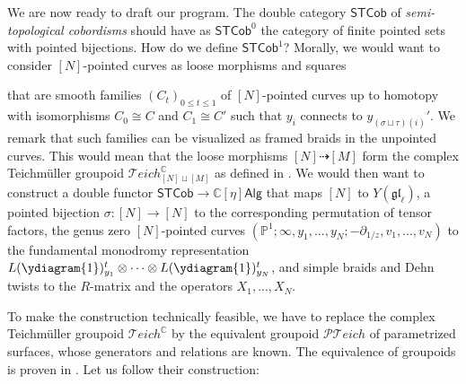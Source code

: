 \documentclass[11pt]{report}
\theoremstyle{definition}
\theoremstyle{remark}
\theoremstyle{remark}
\newcommand{\C}{\mathbb{C}}
\renewcommand{\P}{\mathbb{P}}
\begin{document}
We are now ready to draft our program. The double category $\mathsf{STCob}$ of \emph{semi-topological cobordisms} should have as $\mathsf{STCob}^0$ the category of finite pointed sets with pointed bijections. How do we define $\mathsf{STCob}^1$? Morally, we would want to consider $[N]$-pointed curves as loose morphisms and squares
\begin{center}
\end{center}
that are smooth families $(C_t)_{0 \leq t \leq 1}$ of $[N]$-pointed curves up to homotopy with isomorphisms $C_0 \cong C$ and $C_1 \cong C'$ such that $y_i$ connects to $y_{(\sigma \sqcup \tau)(i)}'$. We remark that such families can be visualized as framed braids in the unpointed curves. This would mean that the loose morphisms $[N] \dashrightarrow [M]$ form the complex Teichmüller groupoid $\mathcal{T}eich_{[N] \sqcup [M]}^\C$ as defined in \cite{book:bakalov}. We would then want to construct a double functor $\mathsf{STCob} \to \C[\eta]\mathsf{Alg}$ that maps $[N]$ to $Y(\mathfrak{gl}_\ell)$, a pointed bijection $\sigma: [N] \to [N]$ to the corresponding permutation of tensor factors, the genus zero $[N]$-pointed curves $(\P^1;\infty,y_1,...,y_N;-\partial_{1/z},v_1,...,v_N)$ to the fundamental monodromy representation $L(\ydiagram{1})_{y_1}^t \otimes \cdots \otimes L(\ydiagram{1})_{y_N}^t$, and simple braids and Dehn twists to the $R$-matrix and the operators $X_1,...,X_N$.

To make the construction technically feasible, we have to replace the complex Teichmüller groupoid $\mathcal{T}eich^\C$ by the equivalent groupoid $\mathcal{PT}eich$ of parametrized surfaces, whose generators and relations are known. The equivalence of groupoids is proven in \cite{book:bakalov}. Let us follow their construction:
\end{document}
